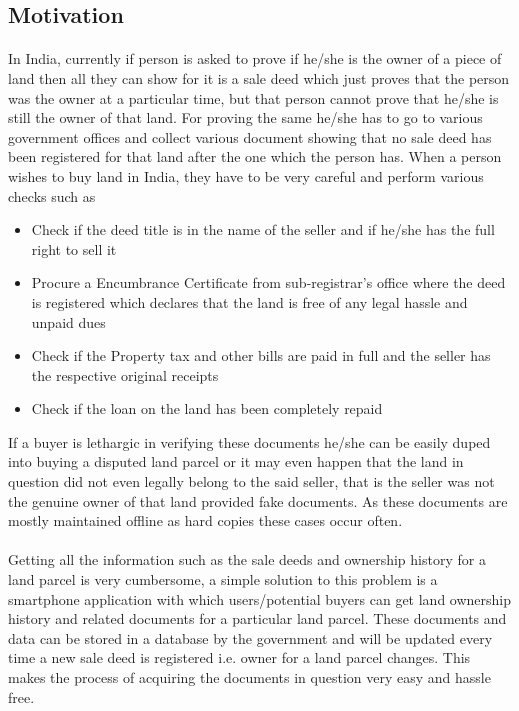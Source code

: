 \documentclass{article}
\begin{document}
    \subsection{Motivation}
        \paragraph{}
        In India, currently if person is asked to prove if he/she is the owner of a piece of land then all they can show for it is a sale deed which just proves that the person was the owner at a particular time, but that person cannot prove that he/she is still the owner of that land. For proving the same he/she has to go to various government offices and collect various document showing that no sale deed has been registered for that land after the one which the person has. When a person wishes to buy land in India, they have to be very careful and perform various checks such as
        \begin{itemize}
            \item Check if the deed title is in the name of the seller and if he/she has the full right to sell it
            \item Procure a Encumbrance Certificate from sub-registrar's office where the deed is registered which declares that the land is free of any legal hassle and unpaid dues
            \item Check if the Property tax and other bills are paid in full and the seller has the respective original receipts
            \item Check if the loan on the land has been completely repaid
        \end{itemize}
        If a buyer is lethargic in verifying these documents he/she can be easily duped into buying a disputed land parcel or it may even happen that the land in question did not even legally belong to the said seller, that is the seller was not the genuine owner of that land provided fake documents. As these documents are mostly maintained offline as hard copies these cases occur often.

        \paragraph{}
        Getting all the information such as the sale deeds and ownership history for a land parcel is very cumbersome, a simple solution to this problem is a smartphone application with which users/potential buyers can get land ownership history and related documents for a particular land parcel. These documents and data can be stored in a database by the government and will be updated every time a new sale deed is registered i.e. owner for a land parcel changes. This makes the process of acquiring the documents in question very easy and hassle free.
\end{document}
